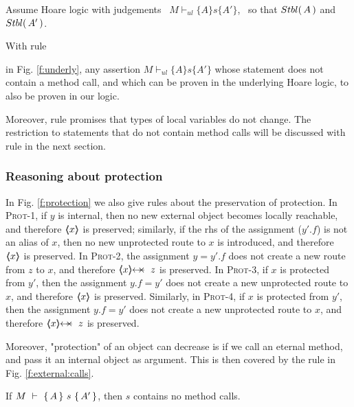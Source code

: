 \begin{axiom}
\label{ax:ul}
{Assume   Hoare logic with judgements %
\ $M \vdash_{ul} \{ A \} s \{ A' \}$, \ 
so that ${Stbl(\, A\, )}$ and ${Stbl(\, A'\, )}$. }
\end{axiom}

With rule {{\sc{extend}} in Fig. \ref{f:underly},  any assertion $M \vdash_{ul} \{ A \} s \{ A' \}$  whose statement does not contain a method call, and which 
can be proven in the underlying Hoare logic, to also be proven in our logic.


Moreover, rule {} promises that types of local variables do not change. The restriction to statements that do not contain method calls will be discussed with rule {} in the next section.

 

 \subsubsection{Reasoning about protection}

{
In Fig. \ref{f:protection} we also give rules about the preservation of protection.
In \textsc{Prot-1}, if $y$ is internal, then no new external object becomes locally reachable, and therefore $ \langle\!\!\langle x \rangle\!\!\rangle$ is preserved;
similarly, if the rhs of the assignment ($y'.f$) is not an alias of $x$, then no new unprotected route to $x$ is introduced, and therefore  $ \langle\!\!\langle x \rangle\!\!\rangle$ is preserved.
In \textsc{Prot-2}, the assignment $y=y'.f$ does not create a new route from $z$ to $x$, and therefore  $\protectedFrom{x}{z}$ is preserved.
In \textsc{Prot-3}, if $x$ is protected from $y'$, then the assignment $y.f=y'$ does not create a new unprotected route   to $x$, and therefore  $\langle\!\!\langle x \rangle\!\!\rangle$ is preserved.
Similarly, in \textsc{Prot-4}, if $x$ is protected from $y'$, then the assignment $y.f=y'$ does not create a new unprotected route  to $x$, and therefore   $\protectedFrom{x}{z}$ is preserved.
}

Moreover, "protection" of an object can decrease is if we call an eternal method, and pass it an internal object as argument. This is then covered by the rule in Fig. \ref{f:external:calls}.

\begin{lemma}
\label{l:no:meth:calls}
If ${M\ \vdash\ \{\,A\, \} \ s\  \{\,A'\, \} }$, then $s$ contains no method calls.
\end{lemma}
  


}
